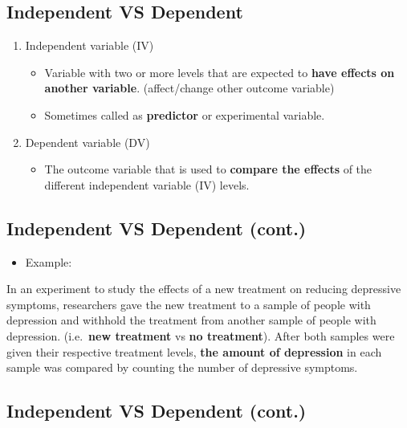 \documentclass[]{article}
\providecommand{\tightlist}{%
  \setlength{\itemsep}{0pt}\setlength{\parskip}{0pt}}
\begin{document}
\hypertarget{independent-vs-dependent}{%
\subsection{Independent VS Dependent}\label{independent-vs-dependent}}

\begin{enumerate}
\def\labelenumi{\arabic{enumi}.}
\tightlist
\item
  Independent variable (IV)

  \begin{itemize}
  \tightlist
  \item
    Variable with two or more levels that are expected to {\textbf{have
    effects on another variable}}. (affect/change other outcome
    variable)
  \item
    Sometimes called as {\textbf{predictor}} or experimental variable.
  \end{itemize}
\item
  Dependent variable (DV)

  \begin{itemize}
  \tightlist
  \item
    The outcome variable that is used to {\textbf{compare the effects}}
    of the different independent variable (IV) levels.
  \end{itemize}
\end{enumerate}

\hypertarget{independent-vs-dependent-cont.}{%
\subsection{Independent VS Dependent
(cont.)}\label{independent-vs-dependent-cont.}}

\begin{itemize}
\tightlist
\item
  Example:
\end{itemize}

In an experiment to study the effects of a new treatment on reducing
depressive symptoms, researchers gave the new treatment to a sample of
people with depression and withhold the treatment from another sample of
people with depression. (i.e.~{\textbf{new treatment}} vs {\textbf{no
treatment}}). After both samples were given their respective treatment
levels, {\textbf{the amount of depression}} in each sample was compared
by counting the number of depressive symptoms.

\hypertarget{independent-vs-dependent-cont.-1}{%
\subsection{Independent VS Dependent
(cont.)}\label{independent-vs-dependent-cont.-1}}
\end{document}
